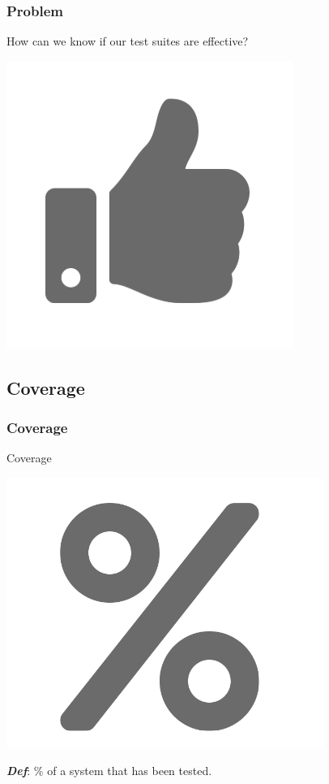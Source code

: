 \begin{frame}
	\frametitle{Problem}
	\begin{center}
		\huge{How can we know if our test suites are effective?}

		\includegraphics[scale = .25]{images/thumb}
	\end{center}
\end{frame}

\subsection{Coverage}
\begin{frame}
	\frametitle{Coverage}
		\begin{center}
			\huge{Coverage}

			\includegraphics[scale = 0.25]{images/percent.png}

			\textbf{\textit{Def}}: \% of a system that has been tested.
		\end{center}




\end{frame}

